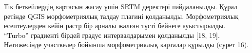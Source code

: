 
Тік беткейлердің картасын жасау үшін SRTM деректері пайдаланылды. Құрал
ретінде QGIS морфометриялық талдау плагині қолданылды. Морфометриялық
есептеулерден кейін растр бір арналы жалған түсті бейнеге ауыстырылды.
``Turbo'' градиенті бірдей градус интервалдарымен қолданылды {[}18,
19{]}. Нәтижесінде участкелер бойынша морфометриялық карталар құрылды
(сурет 16).

